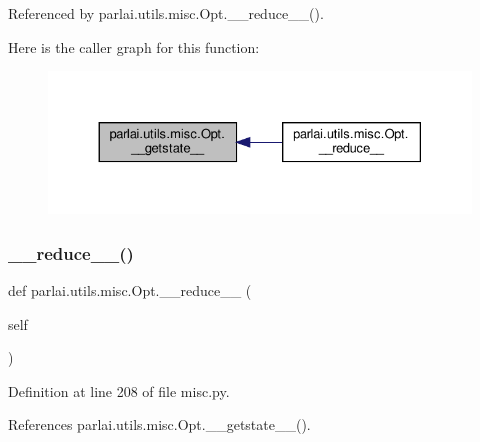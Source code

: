 Referenced by parlai.\+utils.\+misc.\+Opt.\+\_\+\+\_\+reduce\+\_\+\+\_\+().

Here is the caller graph for this function\+:
\nopagebreak
\begin{figure}[H]
\begin{center}
\leavevmode
\includegraphics[width=330pt]{classparlai_1_1utils_1_1misc_1_1Opt_a7fae2d1b6ffb48970e59923787adb905_icgraph}
\end{center}
\end{figure}
\mbox{\label{classparlai_1_1utils_1_1misc_1_1Opt_a1304900ba795187adb8bd4a564a435a8}} 
\subsubsection{\texorpdfstring{\+\_\+\+\_\+reduce\+\_\+\+\_\+()}{\_\_reduce\_\_()}}
{\footnotesize\ttfamily def parlai.\+utils.\+misc.\+Opt.\+\_\+\+\_\+reduce\+\_\+\+\_\+ (\begin{DoxyParamCaption}\item[{}]{self }\end{DoxyParamCaption})}



Definition at line 208 of file misc.\+py.



References parlai.\+utils.\+misc.\+Opt.\+\_\+\+\_\+getstate\+\_\+\+\_\+().

